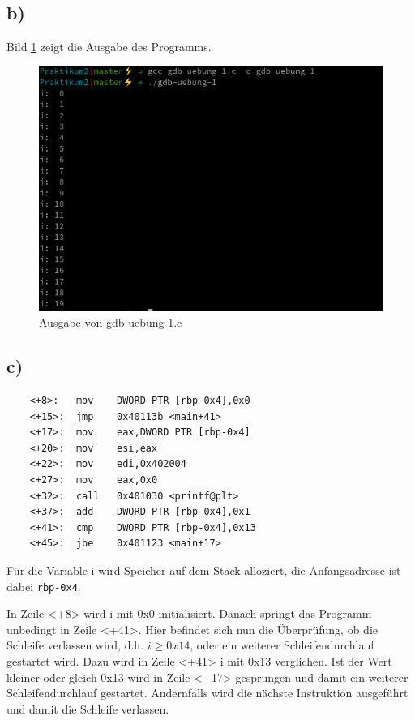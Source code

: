 \documentclass[12pt]{article}
\begin{document}
\subsection{b)}
Bild \ref{fig:aufgabe1b} zeigt die Ausgabe des Programms.
\begin{figure}[h]
	\includegraphics[scale=0.9]{Pictures/aufgabe1b.png}
	\caption{Ausgabe von gdb-uebung-1.c}
	\label{fig:aufgabe1b}
\end{figure}

\subsection{c)}
\begin{lstlisting}
	<+8>:	mov    DWORD PTR [rbp-0x4],0x0
    <+15>:	jmp    0x40113b <main+41>
    <+17>:	mov    eax,DWORD PTR [rbp-0x4]
    <+20>:	mov    esi,eax
    <+22>:	mov    edi,0x402004
    <+27>:	mov    eax,0x0
    <+32>:	call   0x401030 <printf@plt>
    <+37>:	add    DWORD PTR [rbp-0x4],0x1
    <+41>:	cmp    DWORD PTR [rbp-0x4],0x13
    <+45>:	jbe    0x401123 <main+17>
\end{lstlisting}

Für die Variable i wird Speicher auf dem Stack alloziert, die Anfangsadresse ist dabei \texttt{rbp-0x4}.

In Zeile <+8> wird i mit 0x0 initialisiert. Danach springt das Programm unbedingt in Zeile <+41>. Hier befindet sich nun die Überprüfung, ob die Schleife verlassen wird, d.h. $ i \ge 0x14 $, oder ein weiterer Schleifendurchlauf gestartet wird. Dazu wird in Zeile <+41> i mit 0x13 verglichen. Ist der Wert kleiner oder gleich 0x13 wird in Zeile <+17> gesprungen und damit ein weiterer Schleifendurchlauf gestartet. Andernfalls wird die nächste Instruktion ausgeführt und damit die Schleife verlassen.
\end{document}
